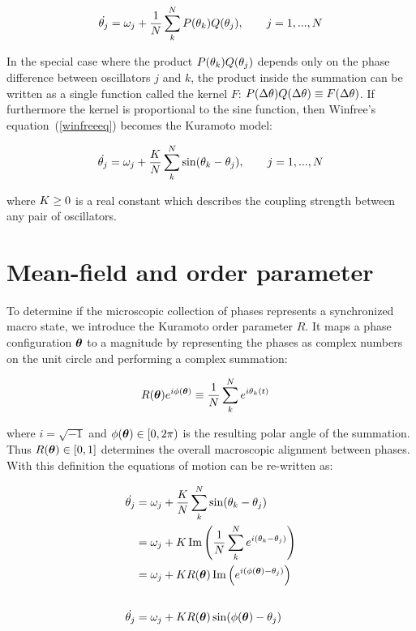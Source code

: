 \begin{equation}
    \dot{\theta_j} = \omega_j + \frac{1}{N}\sum^{N}_{k}P(\theta_k)Q(\theta_j), \qquad j=1,...,N
    \label{winfreeeq}
\end{equation}

In the special case where the product $P(\theta_k)Q(\theta_j)$ depends only on the phase difference between oscillators $j$ and $k$,
the product inside the summation can be written as a single function called the kernel $F$: $P(\Delta \theta)Q(\Delta \theta) \equiv
F(\Delta \theta)$. If furthermore the kernel is proportional to the sine function, then Winfree's equation~(\ref{winfreeeq}) becomes
the Kuramoto model:

\begin{equation}
    \dot{\theta_j} = \omega_j + \frac{K}{N}\sum^{N}_{k}\sin(\theta_k - \theta_j), \qquad j=1,...,N
    \label{kura}
\end{equation}

\noindent where $K \geq 0$ is a real constant which describes the coupling strength between any pair of oscillators.

\section{Mean-field and order parameter}

To determine if the microscopic collection of phases represents a synchronized macro state, we introduce the Kuramoto order parameter
$R$. It maps a phase configuration $\bm{\theta}$ to a magnitude by representing the phases as complex numbers on the unit circle
and performing a complex summation:

\begin{align}
    R(\bm{\theta})e^{i\phi(\bm{\theta})} &\equiv \frac{1}{N} \sum^{N}_{k} e^{i\theta_k(t)}
    \label{kuramotoop}
\end{align}

\noindent where $i=\sqrt{-1}$ and $\phi(\bm{\theta})\in[0,2\pi)$ is the resulting polar angle of the summation. Thus $R( \bm{\theta})
\in [0,1]$ determines the overall macroscopic alignment between phases. With this definition the equations of motion can be
re-written as:

\begin{align}
    \dot{\theta_j} &= \omega_j + \frac{K}{N}\sum^{N}_{k}\sin(\theta_k - \theta_j) \notag \\
                   &= \omega_j + K \operatorname{Im}\left( \frac{1}{N}\sum^{N}_{k} e^{i(\theta_k-\theta_j)} \right) \notag \\
                   &= \omega_j + K R(\bm{\theta}) \operatorname{Im}\left( e^{i(\phi(\bm{\theta}) - \theta_j)} \right) \notag \\[18pt]
    \dot{\theta_j} &= \omega_j + K R(\bm{\theta}) \sin ( \phi(\bm{\theta}) - \theta_j )
    \label{kuramf}
\end{align}

